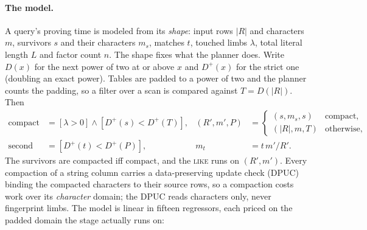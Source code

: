 \paragraph{The model.}
A query's proving time is modeled from its \emph{shape}: input rows
$|R|$ and characters $m$, survivors $s$ and their characters $m_s$,
matches $t$, touched limbs $\lambda$, total literal length $L$ and
factor count $n$. The shape fixes what the planner does. Write $D(x)$ for
the next power of two at or above $x$ and $D^+(x)$ for the strict one
(doubling an exact power). Tables are padded to a power of two and the
planner counts the padding, so a filter over a scan is compared against
$T = D(|R|)$. Then
\begin{align*}
  \mathrm{compact}  &= [\lambda > 0] \wedge [D^+(s) < D^+(T)], &
  (R', m', P)     &= \begin{cases} (s, m_s, s) & \mathrm{compact},\\
                                    (|R|, m, T) & \text{otherwise,} \end{cases}\\
  \mathrm{second} &= [D^+(t) < D^+(P)], &
  m_t             &= t\, m' / R'.
\end{align*}
The survivors are compacted iff $\mathrm{compact}$, and the
\textsc{like} runs on $(R', m')$. Every compaction of a string column
carries a data-preserving update check (DPUC) binding the compacted
characters to their source rows, so a compaction costs work over its
\emph{character} domain; the DPUC reads characters only, never
fingerprint limbs. The model is linear in fifteen regressors, each priced
on the padded domain the stage actually runs on:
